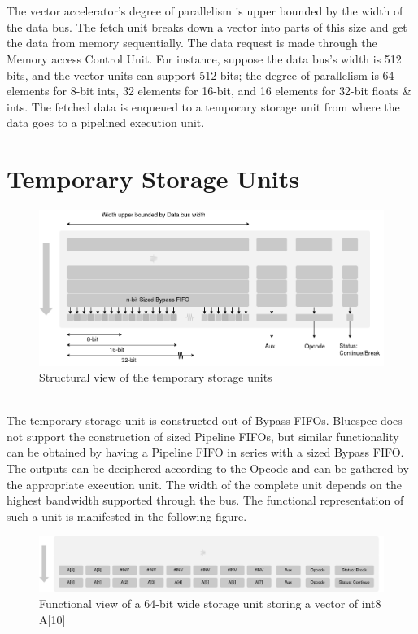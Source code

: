 \begin{paper}
\renewcommand*{\pagemark}{}

\section*{}
The vector accelerator's degree of parallelism is upper bounded by the width of the data bus. The fetch unit breaks down a vector into parts of this size and get the data from memory sequentially. The data request is made through the Memory access Control Unit. For instance, suppose the data bus's width is 512 bits, and the vector units can support 512 bits; the degree of parallelism is 64 elements for 8-bit ints, 32 elements for 16-bit, and 16 elements for 32-bit floats \& ints. The fetched data is enqueued to a temporary storage unit from where the data goes to a pipelined execution unit.

\section*{Temporary Storage Units\sdot}
\begin{figure}[H]
\centering
\includegraphics[width=\textwidth]{Images/VectorExtensions-temp_structure(2).png}
\caption{\content Structural view of the temporary storage units}
\end{figure}\\
\nointend The temporary storage unit is constructed out of Bypass FIFOs. Bluespec does not support the construction of sized Pipeline FIFOs, but similar functionality can be obtained by having a Pipeline FIFO in series with a sized Bypass FIFO. The outputs can be deciphered according to the Opcode and can be gathered by the appropriate execution unit. The width of the complete unit depends on the highest bandwidth supported through the bus. The functional representation of such a unit is manifested in the following figure.
\begin{figure}[H]
\centering
\includegraphics[width=\textwidth]{Images/VectorExtensions-temp-func(1).png}
\caption{\content Functional view of a 64-bit wide storage unit storing a vector of int8 A[10]}
\end{figure}


\end{paper}